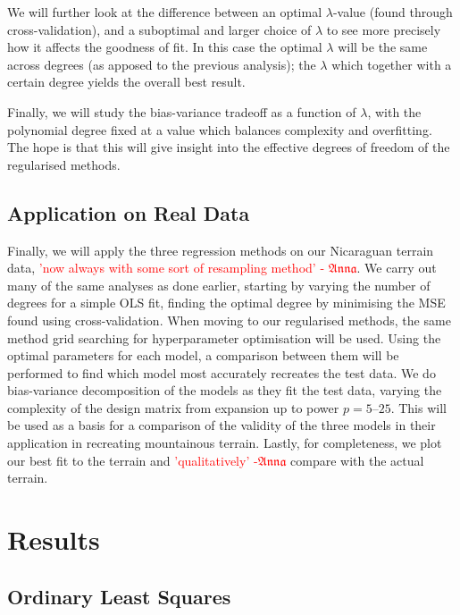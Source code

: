 \documentclass[twocolumn,english,notitlepage]{article}
\newcommand{\comment}[1]{\textcolor{red}{#1}}
\newcommand{\Anna}{$\mathfrak{Anna}$}
\begin{document}
        We will further look at the difference between an optimal $\lambda$-value (found through cross-validation), and a suboptimal and larger choice of $\lambda$ to see more precisely how it affects the goodness of fit. In this case the optimal $\lambda$ will be the same across degrees (as apposed to the previous analysis); the $\lambda$ which together with a certain degree yields the overall best result.

        Finally, we will study the bias-variance tradeoff as a function of $\lambda$, with the polynomial degree fixed at a value which balances complexity and overfitting. The hope is that this will give insight into the effective degrees of freedom of the regularised methods.

    \subsection{Application on Real Data}
        Finally, we will apply the three regression methods on our Nicaraguan terrain data, \comment{'now always with some sort of resampling method' - \Anna}. We carry out many of the same analyses as done earlier, starting by varying the number of degrees for a simple OLS fit, finding the optimal degree by minimising the MSE found using cross-validation.
        When moving to our regularised methods, the same method grid searching for hyperparameter optimisation will be used. Using the optimal parameters for each model, a comparison between them will be performed to find which model most accurately recreates the test data. We do bias-variance decomposition of the models as they fit the test data, varying the complexity of the design matrix from expansion up to power $p=5\text{--}25$. This will be used as a basis for a comparison of the validity of the three models in their application in recreating mountainous terrain. Lastly, for completeness, we plot our best fit to the terrain and \comment{'qualitatively' -\Anna} compare with the actual terrain.


\section{Results}
    \subsection{Ordinary Least Squares}
\end{document}
